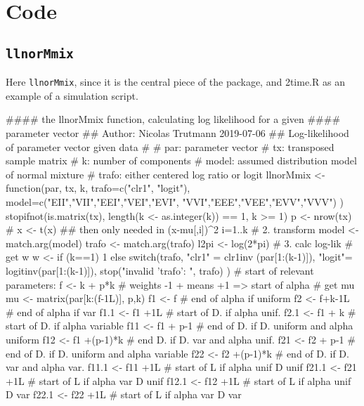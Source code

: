 \chapter{\Rp Code}
\section{{\tt llnorMmix}}

Here {\tt llnorMmix}, since it is the central piece of the package,
and 2time.R as an example of a simulation script.


\begin{Schunk}
\begin{Soutput}
#### the llnorMmix function, calculating log likelihood for a given
#### parameter vector
## Author: Nicolas Trutmann 2019-07-06
## Log-likelihood of parameter vector given data
#
# par:   parameter vector
# tx:    transposed sample matrix
# k:     number of components
# model: assumed distribution model of normal mixture
# trafo: either centered log ratio or logit
llnorMmix <- function(par, tx, k,
                      trafo=c("clr1", "logit"),
                      model=c("EII","VII","EEI","VEI","EVI",
                              "VVI","EEE","VEE","EVV","VVV")
                      ) {
    stopifnot(is.matrix(tx),
              length(k <- as.integer(k)) == 1, k >= 1)
    p <- nrow(tx)
#    x <- t(x) ## then only needed in   (x-mu[,i])^2  i=1..k
    # 2. transform
    model <- match.arg(model)
    trafo <- match.arg(trafo)
    l2pi <- log(2*pi)
    # 3. calc log-lik
    # get w
    w <- if (k==1) 1
         else switch(trafo,
                     "clr1" = clr1inv (par[1:(k-1)]),
                     "logit"= logitinv(par[1:(k-1)]),
                     stop("invalid 'trafo': ", trafo)
         )
    # start of relevant parameters:
    f <- k + p*k # weights -1 + means +1 => start of alpha
    # get mu
    mu <- matrix(par[k:(f-1L)], p,k)
    f1 <- f      # end of alpha if uniform
    f2 <- f+k-1L # end of alpha if var
    f1.1 <- f1 +1L # start of D. if alpha unif.
    f2.1 <- f1 + k # start of D. if alpha variable
    f11 <- f1 + p-1    # end of D. if D. uniform and alpha uniform
    f12 <- f1 +(p-1)*k # end    D. if D.   var   and alpha unif.
    f21 <- f2 + p-1    # end of D. if D. uniform and alpha variable
    f22 <- f2 +(p-1)*k # end of D. if D.   var   and alpha var.
    f11.1 <- f11 +1L # start of L if alpha unif  D unif
    f21.1 <- f21 +1L # start of L if alpha var   D unif
    f12.1 <- f12 +1L # start of L if alpha unif  D var
    f22.1 <- f22 +1L # start of L if alpha var   D var
}
\end{Soutput}
\end{Schunk}
